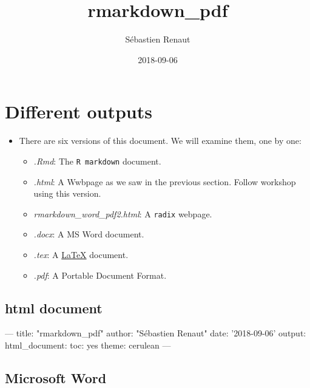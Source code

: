\documentclass[]{article}
\title{rmarkdown\_pdf}
\author{Sébastien Renaut}
\date{2018-09-06}
\newenvironment{Shaded}{\begin{snugshade}}{\end{snugshade}}
\newcommand{\NormalTok}[1]{#1}
\providecommand{\tightlist}{%
  \setlength{\itemsep}{0pt}\setlength{\parskip}{0pt}}
\begin{document}
\maketitle

{
\setcounter{tocdepth}{2}
\tableofcontents
}
\hypertarget{different-outputs}{%
\section{Different outputs}\label{different-outputs}}

\begin{itemize}
\tightlist
\item
  There are six versions of this document. We will examine them, one by
  one:

  \begin{itemize}
  \tightlist
  \item
    \emph{.Rmd}: The \texttt{R\ markdown} document.
  \item
    \emph{.html}: A Wwbpage as we saw in the previous section. Follow
    workshop using this version.
  \item
    \emph{rmarkdown\_word\_pdf2.html}: A \texttt{radix} webpage.
  \item
    \emph{.docx}: A MS Word document.
  \item
    \emph{.tex}: A \href{https://www.latex-project.org}{LaTeX} document.
  \item
    \emph{.pdf}: A Portable Document Format.
  \end{itemize}
\end{itemize}

\hypertarget{html-document}{%
\subsection{html document}\label{html-document}}

\begin{Shaded}
\begin{Highlighting}[]
\NormalTok{---    }
\NormalTok{title: "rmarkdown_pdf"    }
\NormalTok{author: "Sébastien Renaut"    }
\NormalTok{date: '2018-09-06'    }
\NormalTok{output: }
\NormalTok{  html_document: }
\NormalTok{    toc: yes }
\NormalTok{    theme: cerulean }
\NormalTok{--- }
\end{Highlighting}
\end{Shaded}

\hypertarget{microsoft-word}{%
\subsection{Microsoft Word}\label{microsoft-word}}
\end{document}
